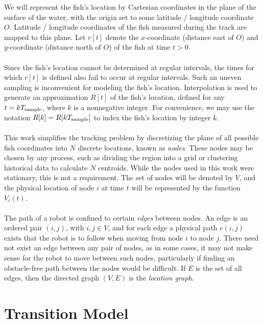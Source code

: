 \documentclass[11pt,letterpaper]{article}
\begin{document}
	We will represent the fish's location by Cartesian coordinates in the plane of the surface of the water, with the origin set to some latitude / longitude coordinate $O$. Latitude / longitude coordinates of the fish measured during the track are mapped to this plane. Let $r[t]$ denote the $x$-coordinate (distance east of $O$) and $y$-coordinate (distance north of $O$) of the fish at time $t > 0$.
	\\\\
	Since the fish's location cannot be determined at regular intervals, the times for which $r[t]$ is defined also fail to occur at regular intervals. Such an uneven sampling is inconvenient for modeling the fish's location. Interpolation is used to generate an approximation $R[t]$ of the fish's location, defined for any $t = kT_{\rm sample}$, where $k$ is a nonnegative integer. For convenience, we may use the notation $R[k] = R[k T_{\rm sample}]$ to index the fish's location by integer $k$.	
	\\\\
	This work simplifies the tracking problem by discretizing the plane of all possible fish coordinates into $N$ discrete locations, known as \textit{nodes}. These nodes may be chosen by any process, such as dividing the region into a grid or clustering historical data to calculate $N$ centroids. While the nodes used in this work were stationary, this is not a requirement. The set of nodes will be denoted by $V$, and the physical location of node $i$ at time $t$ will be represented by the function $V_i(t)$.
	\\\\
	The path of a robot is confined to certain \textit{edges} between nodes. An edge is an ordered pair $(i, j)$, with $i, j \in V$, and for each edge a physical path $e(i, j)$ exists that the robot is to follow when moving from node $i$ to node $j$. There need not exist an edge between any pair of nodes, as in some cases, it may not make sense for the robot to move between such nodes, particularly if finding an obstacle-free path between the nodes would be difficult. If $E$ is the set of all edges, then the directed graph $(V, E)$ is the \textit{location graph}.
	
	\section{Transition Model}	
	
\end{document}

